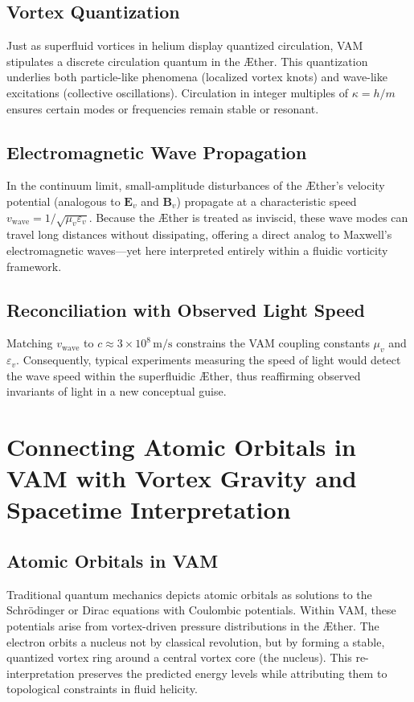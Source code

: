 \subsection{Vortex Quantization}
Just as superfluid vortices in helium display quantized circulation, VAM stipulates a discrete circulation quantum in the Æther. This quantization underlies both particle-like phenomena (localized vortex knots) and wave-like excitations (collective oscillations). Circulation in integer multiples of \( \kappa = h/m \) ensures certain modes or frequencies remain stable or resonant.

\subsection{Electromagnetic Wave Propagation}
In the continuum limit, small-amplitude disturbances of the Æther’s velocity potential (analogous to \(\mathbf{E}_v\) and \(\mathbf{B}_v\)) propagate at a characteristic speed \(v_{\mathrm{wave}} = 1/\sqrt{\mu_v \varepsilon_v}\). Because the Æther is treated as inviscid, these wave modes can travel long distances without dissipating, offering a direct analog to Maxwell’s electromagnetic waves—yet here interpreted entirely within a fluidic vorticity framework.

\subsection{Reconciliation with Observed Light Speed}
Matching \(v_{\mathrm{wave}}\) to \(c \approx 3\times 10^8\,\mathrm{m/s}\) constrains the VAM coupling constants \(\mu_v\) and \(\varepsilon_v\). Consequently, typical experiments measuring the speed of light would detect the wave speed within the superfluidic Æther, thus reaffirming observed invariants of light in a new conceptual guise.

\section{Connecting Atomic Orbitals in VAM with Vortex Gravity and Spacetime Interpretation}

\subsection{Atomic Orbitals in VAM}
Traditional quantum mechanics depicts atomic orbitals as solutions to the Schrödinger or Dirac equations with Coulombic potentials. Within VAM, these potentials arise from vortex-driven pressure distributions in the Æther. The electron orbits a nucleus not by classical revolution, but by forming a stable, quantized vortex ring around a central vortex core (the nucleus). This re-interpretation preserves the predicted energy levels while attributing them to topological constraints in fluid helicity.

